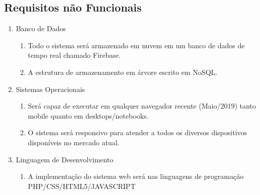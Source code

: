 \documentclass[12pt]{article}
\begin{document}
    \subsection{Requisitos não Funcionais}
        \begin{enumerate}
            \item Banco de Dados
                \begin{enumerate}
                    \item Todo o sistema será armazenado em nuvem em um banco de dados de tempo real chamado Firebase.
                    \item A estrutura de armazenamento em árvore escrito em NoSQL.
                \end{enumerate}
            \item Sistemas Operacionais
                \begin{enumerate}
                    \item 	Será capaz de executar em qualquer navegador recente (Maio/2019) tanto mobile quanto em desktops/notebooks.
                    \item O sistema será responsivo para atender a todos os diversos dispositivos disponíveis no mercado atual.
                \end{enumerate}
            \item Linguagem de Desenvolvimento
                \begin{enumerate}
                    \item 	A implementação do sistema web será nas linguagens de programação PHP/CSS/HTML5/JAVASCRIPT
                \end{enumerate}
        \end{enumerate}
        
\end{document}
